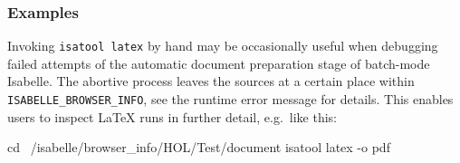 \subsubsection*{Examples}

Invoking \texttt{isatool latex} by hand may be occasionally useful when
debugging failed attempts of the automatic document preparation stage of
batch-mode Isabelle.  The abortive process leaves the sources at a certain
place within \texttt{ISABELLE_BROWSER_INFO}, see the runtime error message for
details.  This enables users to inspect {\LaTeX} runs in further detail, e.g.\ 
like this:

\begin{ttbox}
  cd ~/isabelle/browser_info/HOL/Test/document
  isatool latex -o pdf
\end{ttbox}


